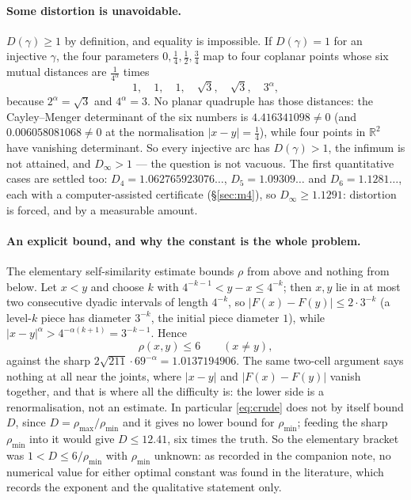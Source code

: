 \documentclass[11pt]{article}
\theoremstyle{remark}
\newcommand{\R}{\mathbb{R}}
\newcommand{\alp}{\alpha}
\begin{document}
\paragraph{Some distortion is unavoidable.} $D(\gamma)\ge1$ by definition, and equality is
impossible. If $D(\gamma)=1$ for an injective $\gamma$, the four parameters
$0,\tfrac14,\tfrac12,\tfrac34$ map to four coplanar points whose six mutual distances are
$\tfrac1{4^{\alp}}$ times
\[
  1,\quad 1,\quad 1,\quad \sqrt3,\quad \sqrt3,\quad 3^{\alp},
\]
because $2^{\alp}=\sqrt3$ and $4^{\alp}=3$. No planar quadruple has those distances: the
Cayley--Menger determinant of the six numbers is $4.416341098\neq0$ (and $0.006058081068\neq0$ at
the normalisation $|x-y|=\tfrac14$), while four points in $\R^2$ have vanishing determinant. So
every injective arc has $D(\gamma)>1$, the infimum is not attained, and $D_\infty>1$ --- the
question is not vacuous. The first quantitative cases are settled too: $D_4=1.062765923076\ldots$,
$D_5=1.09309\ldots$ and $D_6=1.1281\ldots$, each with a computer-assisted certificate
(\S\ref{sec:m4}), so $D_\infty\ge1.1291$: distortion is forced, and by a measurable amount.

\paragraph{An explicit bound, and why the constant is the whole problem.} The elementary
self-similarity estimate bounds $\rho$ from above and nothing from below. Let $x<y$ and choose $k$
with $4^{-k-1}<y-x\le4^{-k}$; then $x,y$ lie in at most two consecutive dyadic intervals of length
$4^{-k}$, so $|F(x)-F(y)|\le2\cdot3^{-k}$ (a level-$k$ piece has diameter $3^{-k}$, the initial
piece diameter $1$), while $|x-y|^{\alp}>4^{-\alp(k+1)}=3^{-k-1}$. Hence
\begin{equation}\label{eq:crude}
  \rho(x,y)\le 6\qquad(x\neq y),
\end{equation}
against the sharp $2\sqrt{211}\cdot69^{-\alp}=1.0137194906$. The same two-cell argument says
nothing at all near the joints, where $|x-y|$ and $|F(x)-F(y)|$ vanish together, and that is where
all the difficulty is: the lower side is a renormalisation, not an estimate. In particular
\eqref{eq:crude} does not by itself bound $D$, since $D=\rho_{\max}/\rho_{\min}$ and it gives no
lower bound for $\rho_{\min}$; feeding the sharp $\rho_{\min}$ into it would give $D\le12.41$, six
times the truth. So the elementary bracket was $1<D\le6/\rho_{\min}$ with $\rho_{\min}$ unknown:
as recorded in the companion note, no numerical value for either optimal constant was found in the
literature, which records the exponent and the qualitative statement only.
\end{document}
